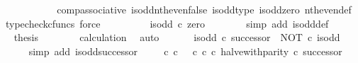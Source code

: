 \begin{isabellebody}
\ {\isachardoublequoteopen}{\isachardot}{\kern0pt}{\isachardot}{\kern0pt}{\isachardot}{\kern0pt}\ {\isacharequal}{\kern0pt}\ {\isasymf}{\isachardoublequoteclose}\isanewline
\ \ \ \ \ \ \isamarkupfalse%
\ comp{\isacharunderscore}{\kern0pt}associative{}\ is{\isacharunderscore}{\kern0pt}odd{\isacharunderscore}{\kern0pt}nth{\isacharunderscore}{\kern0pt}even{\isacharunderscore}{\kern0pt}false\ is{\isacharunderscore}{\kern0pt}odd{\isacharunderscore}{\kern0pt}type\ is{\isacharunderscore}{\kern0pt}odd{\isacharunderscore}{\kern0pt}zero\ nth{\isacharunderscore}{\kern0pt}even{\isacharunderscore}{\kern0pt}def{}\ \isamarkupfalse%
\ {\isacharparenleft}{\kern0pt}typecheck{\isacharunderscore}{\kern0pt}cfuncs{\isacharcomma}{\kern0pt}\ force{\isacharparenright}{\kern0pt}\isanewline
\ \ \ \ \isamarkupfalse%
\ \isamarkupfalse%
\ {\isachardoublequoteopen}{\isachardot}{\kern0pt}{\isachardot}{\kern0pt}{\isachardot}{\kern0pt}\ {\isacharequal}{\kern0pt}\ is{\isacharunderscore}{\kern0pt}odd\ {\isasymcirc}\isactrlsub c\ zero{\isachardoublequoteclose}\isanewline
\ \ \ \ \ \ \isamarkupfalse%
\ {\isacharparenleft}{\kern0pt}simp\ add{\isacharcolon}{\kern0pt}\ is{\isacharunderscore}{\kern0pt}odd{\isacharunderscore}{\kern0pt}def{}{\isacharparenright}{\kern0pt}\isanewline
\ \ \ \ \isamarkupfalse%
\ \isamarkupfalse%
\ {\isacharquery}{\kern0pt}thesis\isanewline
\ \ \ \ \ \ \isamarkupfalse%
\ calculation\ \isamarkupfalse%
\ auto\isanewline
\ \ \isamarkupfalse%
\isanewline
\isanewline
\ \ \isamarkupfalse%
\ {\isachardoublequoteopen}is{\isacharunderscore}{\kern0pt}odd\ {\isasymcirc}\isactrlsub c\ successor\ {\isacharequal}{\kern0pt}\ NOT\ {\isasymcirc}\isactrlsub c\ is{\isacharunderscore}{\kern0pt}odd{\isachardoublequoteclose}\isanewline
\ \ \ \ \isamarkupfalse%
\ {\isacharparenleft}{\kern0pt}simp\ add{\isacharcolon}{\kern0pt}\ is{\isacharunderscore}{\kern0pt}odd{\isacharunderscore}{\kern0pt}successor{\isacharparenright}{\kern0pt}\isanewline
\isanewline
\ \ \isamarkupfalse%
\ {\isachardoublequoteopen}{\isacharparenleft}{\kern0pt}{\isacharparenleft}{\kern0pt}{\isasymf}\ {\isasymcirc}\isactrlsub c\ {\isasymbeta}\isactrlbsub {\isasymnat}\isactrlsub c\isactrlesub {\isacharparenright}{\kern0pt}\ {\isasymamalg}\ {\isacharparenleft}{\kern0pt}{\isasymt}\ {\isasymcirc}\isactrlsub c\ {\isasymbeta}\isactrlbsub {\isasymnat}\isactrlsub c\isactrlesub {\isacharparenright}{\kern0pt}\ {\isasymcirc}\isactrlsub c\ halve{\isacharunderscore}{\kern0pt}with{\isacharunderscore}{\kern0pt}parity{\isacharparenright}{\kern0pt}\ {\isasymcirc}\isactrlsub c\ successor\ {\isacharequal}{\kern0pt}\isanewline

\end{isabellebody}
